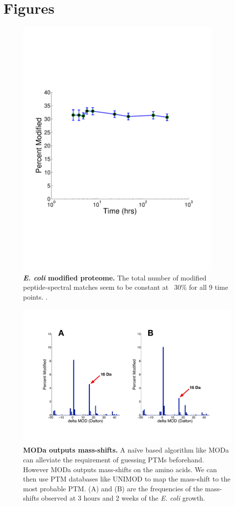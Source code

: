 \documentclass[12pt]{article}
\begin{document}
\newpage

\section*{Figures}

\begin{figure}[!ht]
\centerline{\includegraphics[width=4in]{Figures/PTM_modified.pdf}}
\caption{\label{fig:ModifiedPTM}\textbf{\emph{E. coli} modified proteome.} The total number of modified peptide-spectral matches seem to be constant at ~30\% for all 9 time points. .
}
\end{figure}

\clearpage
\begin{figure}[!ht]
\centerline{\includegraphics[width=8in]{Figures/PTMdalton.pdf}}
\caption{\label{fig:PTMinDalton}\textbf{MODa outputs mass-shifts.} A naïve based algorithm like MODa can alleviate the requirement of guessing PTMs beforehand. However MODa outputs mass-shifts on the amino acids. We can then use PTM databases like UNIMOD to map the mass-shift to the most probable PTM. (A) and (B) are the frequencies of the mass-shifts observed  at 3 hours and 2 weeks of the \emph{E. coli} growth.}
\end{figure}
\end{document}
